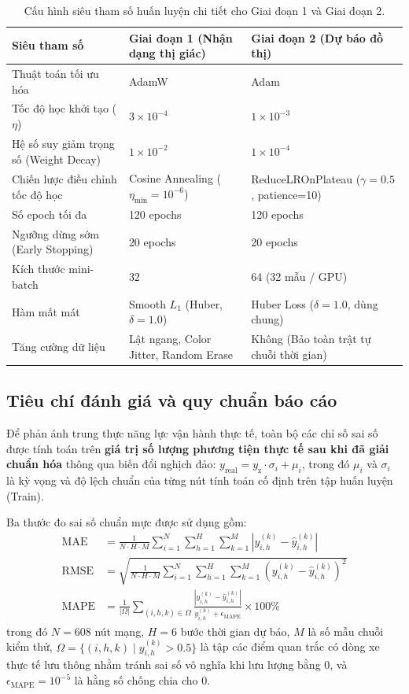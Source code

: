 \begin{table}[htbp]
\centering
\caption{Cấu hình siêu tham số huấn luyện chi tiết cho Giai đoạn 1 và Giai đoạn 2.}
\label{tab:sieu_tham_so_chap5}
\small
\begin{tabularx}{\textwidth}{l X X}
\toprule
\textbf{Siêu tham số} & \textbf{Giai đoạn 1 (Nhận dạng thị giác)} & \textbf{Giai đoạn 2 (Dự báo đồ thị)} \\
\midrule
Thuật toán tối ưu hóa & AdamW & Adam \\
Tốc độ học khởi tạo ($\eta$) & $3 \times 10^{-4}$ & $1 \times 10^{-3}$ \\
Hệ số suy giảm trọng số (Weight Decay) & $1 \times 10^{-2}$ & $1 \times 10^{-4}$ \\
Chiến lược điều chỉnh tốc độ học & Cosine Annealing ($\eta_{\min} = 10^{-6}$) & ReduceLROnPlateau ($\gamma=0.5$, patience=10) \\
Số epoch tối đa & 120 epochs & 120 epochs \\
Ngưỡng dừng sớm (Early Stopping) & 20 epochs & 20 epochs \\
Kích thước mini-batch & 32 & 64 (32 mẫu / GPU) \\
Hàm mất mát & Smooth $L_1$ (Huber, $\delta=1.0$) & Huber Loss ($\delta=1.0$, dùng chung) \\
Tăng cường dữ liệu & Lật ngang, Color Jitter, Random Erase & Không (Bảo toàn trật tự chuỗi thời gian) \\
\bottomrule
\end{tabularx}
\end{table}

\subsection{Tiêu chí đánh giá và quy chuẩn báo cáo}
Để phản ánh trung thực năng lực vận hành thực tế, toàn bộ các chỉ số sai số được tính toán trên \textbf{giá trị số lượng phương tiện thực tế sau khi đã giải chuẩn hóa} thông qua biến đổi nghịch đảo: $y_{\text{real}} = y_{\text{z}} \cdot \sigma_i + \mu_i$, trong đó $\mu_i$ và $\sigma_i$ là kỳ vọng và độ lệch chuẩn của từng nút tính toán cố định trên tập huấn luyện (Train).

Ba thước đo sai số chuẩn mực được sử dụng gồm:
\begin{align}
    \text{MAE} &= \frac{1}{N \cdot H \cdot M} \sum_{i=1}^{N} \sum_{h=1}^{H} \sum_{k=1}^{M} \left| y_{i,h}^{(k)} - \hat{y}_{i,h}^{(k)} \right| \\
    \text{RMSE} &= \sqrt{\frac{1}{N \cdot H \cdot M} \sum_{i=1}^{N} \sum_{h=1}^{H} \sum_{k=1}^{M} \left( y_{i,h}^{(k)} - \hat{y}_{i,h}^{(k)} \right)^2} \\
    \text{MAPE} &= \frac{1}{|\Omega|} \sum_{(i,h,k) \in \Omega} \frac{\left| y_{i,h}^{(k)} - \hat{y}_{i,h}^{(k)} \right|}{y_{i,h}^{(k)} + \epsilon_{\mathrm{MAPE}}} \times 100\%
\end{align}
trong đó $N = 608$ nút mạng, $H = 6$ bước thời gian dự báo, $M$ là số mẫu chuỗi kiểm thử, $\Omega = \{(i,h,k) \mid y_{i,h}^{(k)} > 0.5\}$ là tập các điểm quan trắc có dòng xe thực tế lưu thông nhằm tránh sai số vô nghĩa khi lưu lượng bằng 0, và $\epsilon_{\mathrm{MAPE}} = 10^{-5}$ là hằng số chống chia cho 0.

